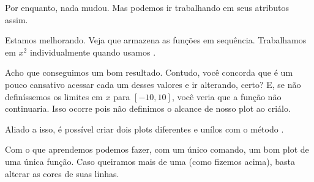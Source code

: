 \documentclass[letterpaper,10pt,english]{jupyterBook}
\begin{document}
\sphinxAtStartPar
Por enquanto, nada mudou. Mas podemos ir trabalhando em seus atributos assim.

\begin{sphinxVerbatim}[commandchars=\\\{\}]
\PYG{p}{[}\PYG{p}{]}   
\end{sphinxVerbatim}

\noindent{}

\sphinxAtStartPar
Estamos melhorando. Veja que  armazena as funções em sequência. Trabalhamos em \(x^2\) individualmente quando usamos .

\begin{sphinxVerbatim}[commandchars=\\\{\}]
   
   
  
   
\end{sphinxVerbatim}

\noindent{}

\sphinxAtStartPar
Acho que conseguimos um bom resultado. Contudo, você concorda que é um pouco cansativo acessar cada um desses valores e ir alterando, certo? E, se não definíssemos os limites em \(x\) para \([-10,10]\), você veria que a função não continuaria. Isso ocorre pois não definimos o alcance de nosso plot ao criá\sphinxhyphen{}lo.

\sphinxAtStartPar
Aliado a isso, é possível criar dois plots diferentes e uní\sphinxhyphen{}los com o método .

\sphinxAtStartPar
Com o que aprendemos podemos fazer, com um único comando, um bom plot de uma única função. Caso queiramos mais de uma (como fizemos acima), basta alterar as cores de suas linhas.
\end{document}
